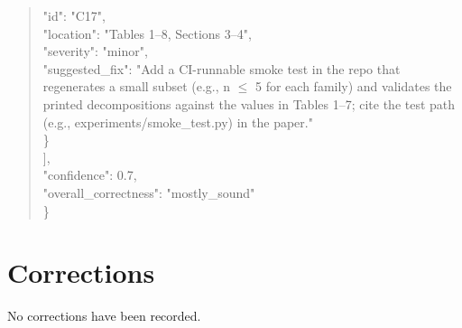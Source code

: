 \documentclass[11pt]{article}
\begin{document}
\begin{quote}
      "id": "C17",\\
      "location": "Tables 1--8, Sections 3--4",\\
      "severity": "minor",\\
      "suggested\_fix": "Add a CI-runnable smoke test in the repo that regenerates a small subset (e.g., n \ensuremath{\le} 5 for each family) and validates the printed decompositions against the values in Tables 1--7; cite the test path (e.g., experiments/smoke\_test.py) in the paper."\\
    \}\\
  ],\\
  "confidence": 0.7,\\
  "overall\_correctness": "mostly\_sound"\\
\}\\
\end{quote}

\section*{Corrections}
No corrections have been recorded.
\end{document}
